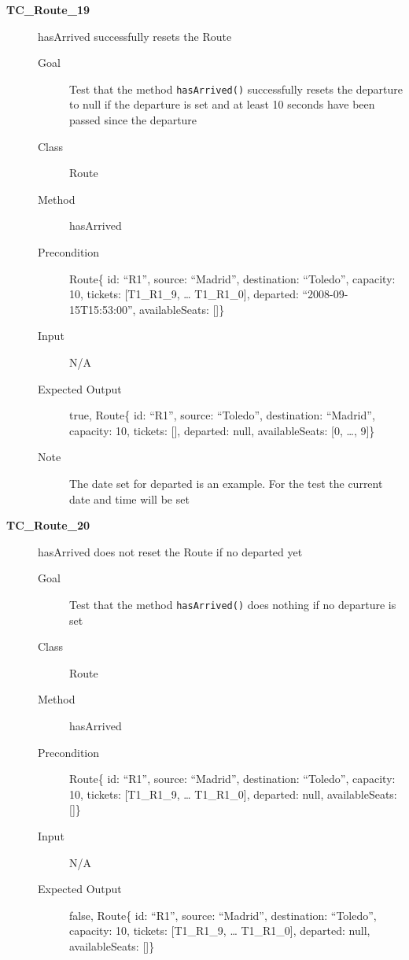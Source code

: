 \documentclass[11pt]{article}
\begin{document}
\begin{description}
\item[{\textbf{TC\_Route\_19}}] hasArrived successfully resets the Route
\begin{description}
\item[{Goal}] Test that the method \texttt{hasArrived()} successfully resets the departure to null if the departure is set and at least 10 seconds have been passed since the departure
\item[{Class}] Route
\item[{Method}] hasArrived
\item[{Precondition}] Route\{ id: “R1”, source: “Madrid”, destination: “Toledo”, capacity: 10,  tickets: [T1\_R1\_9, … T1\_R1\_0], departed: “2008-09-15T15:53:00”, availableSeats: []\}
\item[{Input}] N/A
\item[{Expected Output}] true, Route\{ id: “R1”, source: “Toledo”, destination: “Madrid”, capacity: 10,  tickets: [], departed: null, availableSeats: [0, …, 9]\}
\item[{Note}] The date set for departed is an example. For the test the current date and time will be set
\end{description}

\item[{\textbf{TC\_Route\_20}}] hasArrived does not reset the Route if no departed yet
\begin{description}
\item[{Goal}] Test that the method \texttt{hasArrived()} does nothing if no departure is set
\item[{Class}] Route
\item[{Method}] hasArrived
\item[{Precondition}] Route\{ id: “R1”, source: “Madrid”, destination: “Toledo”, capacity: 10,  tickets: [T1\_R1\_9, … T1\_R1\_0], departed: null, availableSeats: []\}
\item[{Input}] N/A
\item[{Expected Output}] false, Route\{ id: “R1”, source: “Madrid”, destination: “Toledo”, capacity: 10,  tickets: [T1\_R1\_9, … T1\_R1\_0], departed: null, availableSeats: []\}
\end{description}


\end{description}
\end{document}
